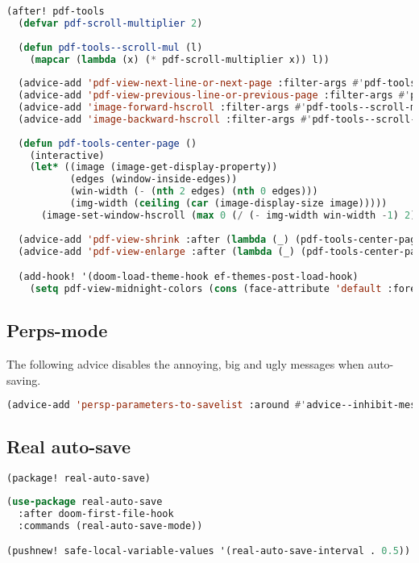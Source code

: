 \documentclass[11pt]{article}
\begin{document}
\begin{lstlisting}[language=Lisp]
(after! pdf-tools
  (defvar pdf-scroll-multiplier 2)
  
  (defun pdf-tools--scroll-mul (l)
    (mapcar (lambda (x) (* pdf-scroll-multiplier x)) l))
  
  (advice-add 'pdf-view-next-line-or-next-page :filter-args #'pdf-tools--scroll-mul)
  (advice-add 'pdf-view-previous-line-or-previous-page :filter-args #'pdf-tools--scroll-mul)
  (advice-add 'image-forward-hscroll :filter-args #'pdf-tools--scroll-mul)
  (advice-add 'image-backward-hscroll :filter-args #'pdf-tools--scroll-mul)
  
  (defun pdf-tools-center-page ()
    (interactive)
    (let* ((image (image-get-display-property))
           (edges (window-inside-edges))
           (win-width (- (nth 2 edges) (nth 0 edges)))
           (img-width (ceiling (car (image-display-size image)))))
      (image-set-window-hscroll (max 0 (/ (- img-width win-width -1) 2)))))
  
  (advice-add 'pdf-view-shrink :after (lambda (_) (pdf-tools-center-page)))
  (advice-add 'pdf-view-enlarge :after (lambda (_) (pdf-tools-center-page)))

  (add-hook! '(doom-load-theme-hook ef-themes-post-load-hook)
    (setq pdf-view-midnight-colors (cons (face-attribute 'default :foreground) (face-attribute 'default :background)))))
\end{lstlisting}

\subsection{Perps-mode}
\label{sec:perps-mode}
The following advice disables the annoying, big and ugly messages when auto-saving.

\begin{lstlisting}[language=Lisp]
(advice-add 'persp-parameters-to-savelist :around #'advice--inhibit-message)
\end{lstlisting}

\subsection{Real auto-save}
\label{sec:real-auto-save}
\begin{lstlisting}[language=Lisp]
(package! real-auto-save)
\end{lstlisting}

\begin{lstlisting}[language=Lisp]
(use-package real-auto-save
  :after doom-first-file-hook
  :commands (real-auto-save-mode))

(pushnew! safe-local-variable-values '(real-auto-save-interval . 0.5))
\end{lstlisting}
\end{document}
